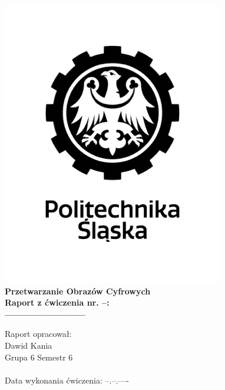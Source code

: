 
\begin{titlepage}
    \begin{center}
        \includegraphics[width=.50\linewidth]{other/polsl.png}\\
        \Huge
        \textbf{Przetwarzanie Obrazów Cyfrowych}
        \\ \vspace{1.5cm}
        \Large
        \textbf{Raport z ćwiczenia nr. --: } \\
        \textbf{--------------------------}       
    \end{center}
    \vspace{3.0cm}
    \Large
    Raport opracował: \\
    Dawid Kania \\
    Grupa 6 Semestr 6 \\ \\
    Data wykonania ćwiczenia: --.--.----
\end{titlepage}
